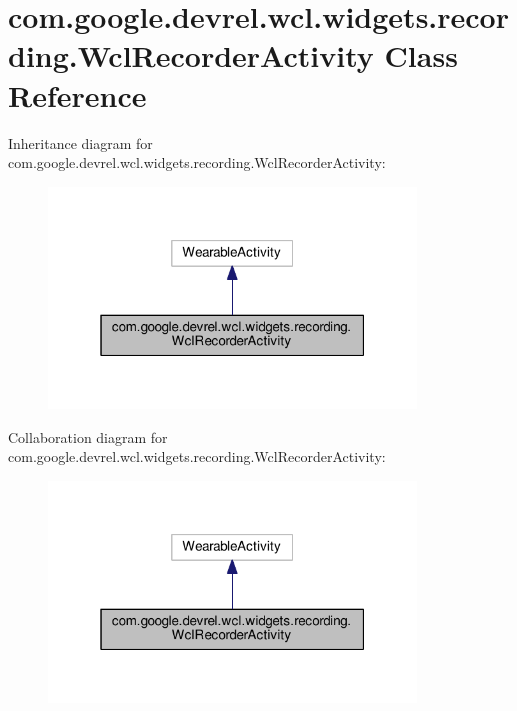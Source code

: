 \hypertarget{classcom_1_1google_1_1devrel_1_1wcl_1_1widgets_1_1recording_1_1WclRecorderActivity}{}\section{com.\+google.\+devrel.\+wcl.\+widgets.\+recording.\+Wcl\+Recorder\+Activity Class Reference}
\label{classcom_1_1google_1_1devrel_1_1wcl_1_1widgets_1_1recording_1_1WclRecorderActivity}


Inheritance diagram for com.\+google.\+devrel.\+wcl.\+widgets.\+recording.\+Wcl\+Recorder\+Activity\+:
\nopagebreak
\begin{figure}[H]
\begin{center}
\leavevmode
\includegraphics[width=277pt]{df/dd7/classcom_1_1google_1_1devrel_1_1wcl_1_1widgets_1_1recording_1_1WclRecorderActivity__inherit__graph}
\end{center}
\end{figure}


Collaboration diagram for com.\+google.\+devrel.\+wcl.\+widgets.\+recording.\+Wcl\+Recorder\+Activity\+:
\nopagebreak
\begin{figure}[H]
\begin{center}
\leavevmode
\includegraphics[width=277pt]{d5/dfc/classcom_1_1google_1_1devrel_1_1wcl_1_1widgets_1_1recording_1_1WclRecorderActivity__coll__graph}
\end{center}
\end{figure}
